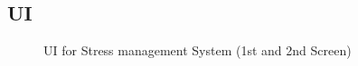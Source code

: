 \subsection{\acf{UI}}
\begin{figure}[hbt!] 
  \centering
  \qquad
  \caption[\acf{UI} for Stress management System (1st and 2nd Screen)]{\acf{UI} for Stress management System (1st and 2nd Screen)}
  \label{fig:S1}
\end{figure}

